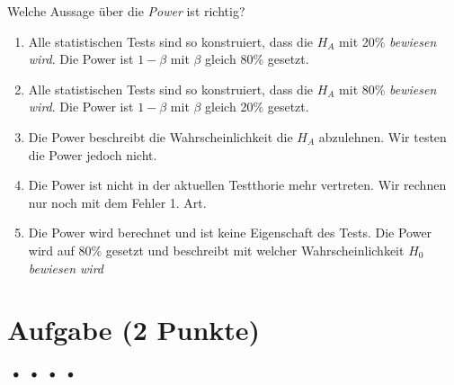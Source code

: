 \documentclass[a4paper, 9pt]{scrartcl}\usepackage[]{graphicx}\usepackage[]{xcolor}
\begin{document}
{%
\ifcollection
\begin{flushright}
\tiny\vspace{-2Ex}
\textbf{\examinhaltstart}
\exammodulebiostat
\vspace{-1Ex}
\end{flushright}
\fi




Welche Aussage über die \textit{Power} ist richtig?



\begin{enumerate}
\item [\textbf{A} \msquare] Alle statistischen Tests sind so konstruiert, dass die $H_A$ mit 20\% \textit{bewiesen wird}. Die Power ist $1-\beta$ mit $\beta$ gleich 80\% gesetzt.
\item [\textbf{B} \msquare] Alle statistischen Tests sind so konstruiert, dass die $H_A$ mit 80\% \textit{bewiesen wird}. Die Power ist $1-\beta$ mit $\beta$ gleich 20\% gesetzt.
\item [\textbf{C} \msquare] Die Power beschreibt die Wahrscheinlichkeit die $H_A$ abzulehnen. Wir testen die Power jedoch nicht.
\item [\textbf{D} \msquare] Die Power ist nicht in der aktuellen Testthorie mehr vertreten. Wir rechnen nur noch mit dem Fehler 1. Art.
\item [\textbf{E} \msquare] Die Power wird berechnet und ist keine Eigenschaft des Tests. Die Power wird auf $80\%$ gesetzt und beschreibt mit welcher Wahrscheinlichkeit $H_0$ \textit{bewiesen wird}
\end{enumerate}

\section{Aufgabe \hfill (2 Punkte)}

\ifcollection
\begin{flushright}
\tiny\vspace{-2Ex}
\textbf{\examinhaltstart}
\exammodulemathstat $\;\bullet$
\exammodulestat $\;\bullet$
\exammodulestatbbv $\;\bullet$
\exammodulestatversuch $\;\bullet$
\exammodulebiostat
\vspace{-1Ex}
\end{flushright}
\fi



}
\end{document}

